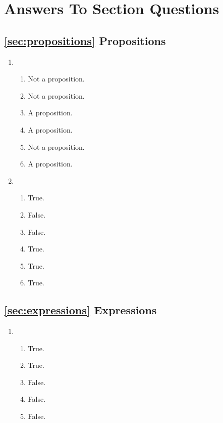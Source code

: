 \documentclass{article}
\begin{document}
  \appendix
  \section{Answers To Section Questions}

  \subsection*{\ref{sec:propositions} Propositions}

      \begin{enumerate} 
        \item
          \begin{enumerate}
            \item Not a proposition.
            \item Not a proposition.
            \item A proposition.
            \item A proposition.
            \item Not a proposition.
            \item A proposition.
          \end{enumerate}
        \item
          \begin{enumerate}
            \item True.
            \item False.
            \item False.
            \item True.
            \item True.
            \item True.
          \end{enumerate}
      \end{enumerate}

  \subsection*{\ref{sec:expressions} Expressions}

      \begin{enumerate} 
        \item
          \begin{enumerate}
            \item True.
            \item True.
            \item False.
            \item False.
            \item False.
          \end{enumerate}
      \end{enumerate}
\end{document}

